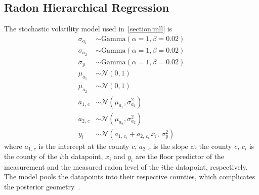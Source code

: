 \subsection{Radon Hierarchical Regression}
The stochastic volatility model used in~\cref{section:mll} is
\begin{align*}
  \sigma_{a_1} &\sim \mathrm{Gamma}\left( \alpha = 1, \beta = 0.02 \right) \\
  \sigma_{a_2} &\sim \mathrm{Gamma}\left( \alpha = 1, \beta = 0.02 \right) \\
  \sigma_{y}  &\sim \mathrm{Gamma}\left( \alpha = 1, \beta = 0.02 \right) \\
  \mu_{a_1}    &\sim \mathcal{N}\left( 0, 1 \right) \\
  \mu_{a_2}    &\sim \mathcal{N}\left( 0, 1 \right) \\
  a_{1,\, c}     &\sim \mathcal{N}\left( \mu_{a_1}, \sigma_{a_1}^2 \right) \\
  a_{2,\, c}     &\sim \mathcal{N}\left( \mu_{a_2}, \sigma_{a_2}^2 \right) \\
  y_i         &\sim \mathcal{N}\left( a_{1,\, c_i} + a_{2,\, c_i}\,x_i,\, \sigma_y^2 \right)
\end{align*}
where \(a_{1,\,c}\) is the intercept at the county \(c\), \(a_{2,\,c}\) is the slope at the county \(c\), \(c_i\) is the county of the \(i\)th datapoint, \(x_i\) and \(y_i\) are the floor predictor of the measurement and the measured radon level of the \(i\)the datapoint, respectively.
The model pools the datapoints into their respective counties, which complicates the posterior geometry~\citep{betancourt_hierarchical_2020}.

